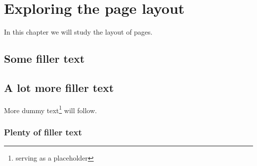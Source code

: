 \documentclass[a4paper,12pt]{book}
\begin{document}
\chapter{Exploring the page layout}
In this chapter we will study the layout of pages.
\section{Some filler text}
\blindtext
\section{A lot more filler text}
More dummy text\footnote{serving as a placeholder}
will follow.
\subsection{Plenty of filler text}
\blindtext[10]
\end{document}

